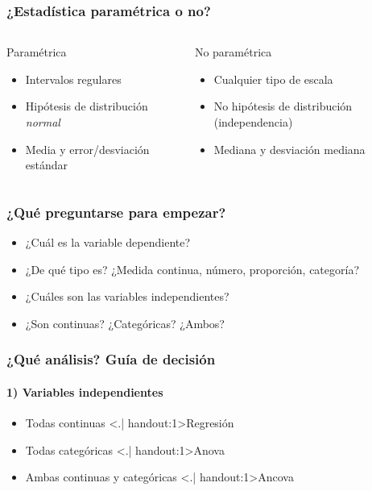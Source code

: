 \documentclass[mathserif]{beamer}
\begin{document}
\begin{frame}[label=paramono]
\frametitle{¿Estad\'istica param\'etrica o no?}
\begin{columns}[t, totalwidth=10cm]
  \begin{column}[]{4.8cm}
    \begin{block}{\alert{Param\'etrica}}
    \begin{itemize}
      \item Intervalos regulares
      \item Hip\'otesis de distribuci\'on \emph{normal}
      \item Media y error/desviaci\'on est\'andar 
    \end{itemize}
    \end{block}
  \end{column}
  \begin{column}[]{4.8cm}
    \begin{block}{\alert{No param\'etrica}}
    \begin{itemize}
      \item Cualquier tipo de escala
      \item No hip\'otesis de distribuci\'on (independencia)
      \item Mediana y desviaci\'on mediana
    \end{itemize}
    \end{block}
  \end{column}
\end{columns}
\end{frame}%


\begin{frame}[label=gestart2]
\frametitle{¿Qu\'e preguntarse para empezar?}
 \begin{itemize}[<+-| handout:1>]
   \item ¿Cu\'al es la variable dependiente? 
   \item ¿De qu\'e tipo es? ¿Medida continua, n\'umero, proporci\'on, categor\'ia?
   \item ¿Cu\'ales son las variables independientes? 
   \item ¿Son continuas? ¿Categ\'oricas? ¿Ambos?
\end{itemize}
\end{frame}%


\begin{frame}[label=whichan1]
\frametitle{¿Qu\'e an\'alisis? Gu\'ia de decisi\'on}
\framesubtitle{1) Variables independientes}
 \begin{itemize}[<+-| handout:1>]
   \item Todas continuas \hfill \alert<.| handout:1>{Regresi\'on}
   \item Todas categ\'oricas \hfill \alert<.| handout:1>{Anova}
   \item Ambas continuas y categ\'oricas \hfill \alert<.| handout:1>{Ancova}
\end{itemize}
\end{frame}%
\end{document}
